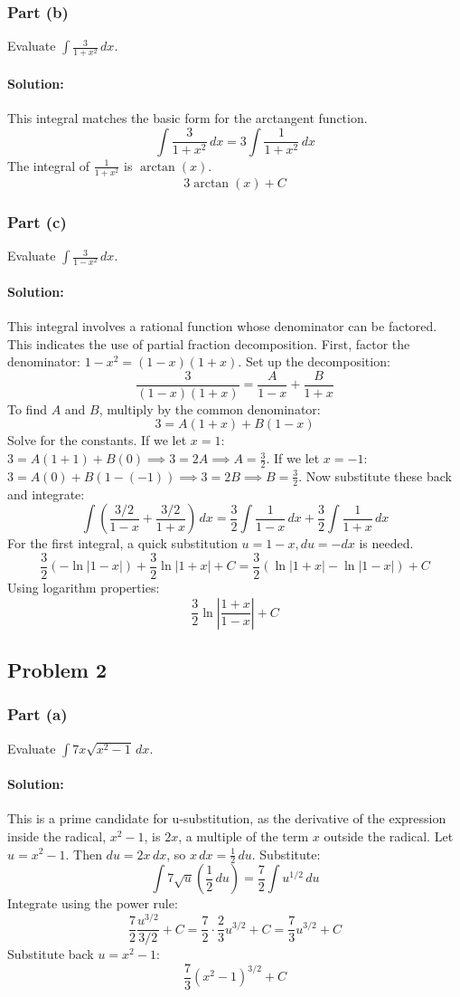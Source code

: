 \documentclass{article}
\begin{document}
\subsubsection*{Part (b)}
Evaluate $\int \frac{3}{1 + x^2} \, dx$.
\paragraph{Solution:} This integral matches the basic form for the arctangent function.
\[ \int \frac{3}{1 + x^2} \, dx = 3 \int \frac{1}{1 + x^2} \, dx \]
The integral of $\frac{1}{1+x^2}$ is $\arctan(x)$.
\[ \boxed{3 \arctan(x) + C} \]

\subsubsection*{Part (c)}
Evaluate $\int \frac{3}{1 - x^2} \, dx$.
\paragraph{Solution:} This integral involves a rational function whose denominator can be factored. This indicates the use of partial fraction decomposition.
First, factor the denominator: $1 - x^2 = (1-x)(1+x)$.
Set up the decomposition:
\[ \frac{3}{(1-x)(1+x)} = \frac{A}{1-x} + \frac{B}{1+x} \]
To find $A$ and $B$, multiply by the common denominator:
\[ 3 = A(1+x) + B(1-x) \]
Solve for the constants.
If we let $x=1$: $3 = A(1+1) + B(0) \implies 3 = 2A \implies A = \frac{3}{2}$.
If we let $x=-1$: $3 = A(0) + B(1-(-1)) \implies 3 = 2B \implies B = \frac{3}{2}$.
Now substitute these back and integrate:
\[ \int \left( \frac{3/2}{1-x} + \frac{3/2}{1+x} \right) \, dx = \frac{3}{2} \int \frac{1}{1-x} \, dx + \frac{3}{2} \int \frac{1}{1+x} \, dx \]
For the first integral, a quick substitution $u=1-x, du=-dx$ is needed.
\[ \frac{3}{2} (-\ln|1-x|) + \frac{3}{2} \ln|1+x| + C = \frac{3}{2} (\ln|1+x| - \ln|1-x|) + C \]
Using logarithm properties:
\[ \boxed{\frac{3}{2} \ln\left|\frac{1+x}{1-x}\right| + C} \]

\subsection{Problem 2}
\subsubsection*{Part (a)}
Evaluate $\int 7x\sqrt{x^2 - 1} \, dx$.
\paragraph{Solution:} This is a prime candidate for u-substitution, as the derivative of the expression inside the radical, $x^2-1$, is $2x$, a multiple of the term $x$ outside the radical.
Let $u = x^2 - 1$. Then $du = 2x \, dx$, so $x \, dx = \frac{1}{2} \, du$.
Substitute:
\[ \int 7 \sqrt{u} \left( \frac{1}{2} \, du \right) = \frac{7}{2} \int u^{1/2} \, du \]
Integrate using the power rule:
\[ \frac{7}{2} \frac{u^{3/2}}{3/2} + C = \frac{7}{2} \cdot \frac{2}{3} u^{3/2} + C = \frac{7}{3} u^{3/2} + C \]
Substitute back $u=x^2-1$:
\[ \boxed{\frac{7}{3} (x^2 - 1)^{3/2} + C} \]
\end{document}
